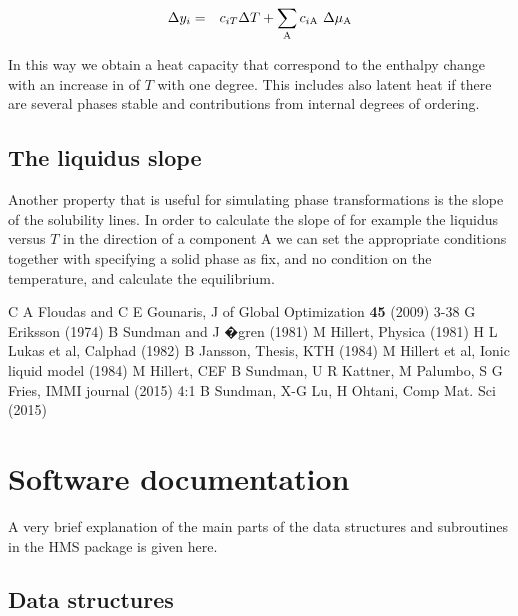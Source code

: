 \documentclass[12pt]{article}
\begin{document}
\begin{eqnarray}
\Delta y_{i}&=& c_{iT}\Delta T +
\sum_{\rm A} c_{i{\rm A}}~\Delta \mu_{\rm A}
\end{eqnarray}

In this way we obtain a heat capacity that correspond to the enthalpy
change with an increase in of $T$ with one degree.  This includes also
latent heat if there are several phases stable and contributions from
internal degrees of ordering.

\subsection{The liquidus slope}

Another property that is useful for simulating phase transformations
is the slope of the solubility lines.  In order to calculate the slope
of for example the liquidus versus $T$ in the direction of a component
A we can set the appropriate conditions together with specifying a
solid phase as fix, and no condition on the temperature, and calculate
the equilibrium.  

\begin{thebibliography}{77Zzz}
 C A Floudas and C E Gounaris, J of Global Optimization
{\bf 45} (2009) 3-38
 G Eriksson (1974)
 B Sundman and J �gren (1981)
 M Hillert, Physica (1981)
 H L Lukas et al, Calphad (1982)
 B Jansson, Thesis, KTH (1984)
 M Hillert et al, Ionic liquid model (1984)
 M Hillert, CEF
 B Sundman, U R Kattner, M Palumbo, S G Fries,
IMMI journal (2015) 4:1
 B Sundman, X-G Lu, H Ohtani, Comp Mat. Sci (2015)
\end{thebibliography}

\newpage

\section{Software documentation}

A very brief explanation of the main parts of the data structures and
subroutines in the HMS package is given here.

\subsection{Data structures}
\end{document}
